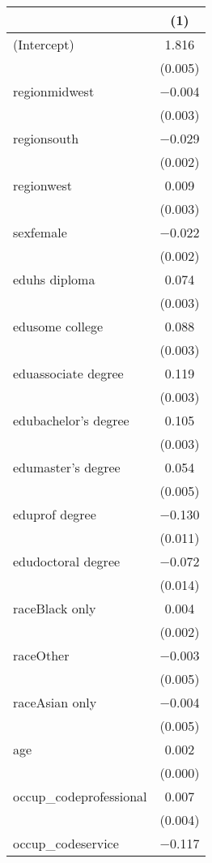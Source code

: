 \documentclass{article}
\begin{document}
\begin{table}
\centering
\begin{tabular}[t]{lc}
\toprule
  & (1)\\
\midrule
(Intercept) & \num{1.816}\\
 & \vphantom{6} (\num{0.005})\\
regionmidwest & \num{-0.004}\\
 & \vphantom{5} (\num{0.003})\\
regionsouth & \num{-0.029}\\
 & \vphantom{3} (\num{0.002})\\
regionwest & \num{0.009}\\
 & \vphantom{4} (\num{0.003})\\
sexfemale & \num{-0.022}\\
 & \vphantom{2} (\num{0.002})\\
eduhs diploma & \num{0.074}\\
 & \vphantom{3} (\num{0.003})\\
edusome college & \num{0.088}\\
 & \vphantom{2} (\num{0.003})\\
eduassociate degree & \num{0.119}\\
 & \vphantom{1} (\num{0.003})\\
edubachelor's degree & \num{0.105}\\
 & (\num{0.003})\\
edumaster's degree & \num{0.054}\\
 & \vphantom{5} (\num{0.005})\\
eduprof degree & \num{-0.130}\\
 & (\num{0.011})\\
edudoctoral degree & \num{-0.072}\\
 & (\num{0.014})\\
raceBlack only & \num{0.004}\\
 & \vphantom{1} (\num{0.002})\\
raceOther & \num{-0.003}\\
 & \vphantom{4} (\num{0.005})\\
raceAsian only & \num{-0.004}\\
 & \vphantom{3} (\num{0.005})\\
age & \num{0.002}\\
 & \vphantom{1} (\num{0.000})\\
occup\_codeprofessional & \num{0.007}\\
 & \vphantom{4} (\num{0.004})\\
occup\_codeservice & \num{-0.117}\\

\end{tabular}
\end{table}
\end{document}
